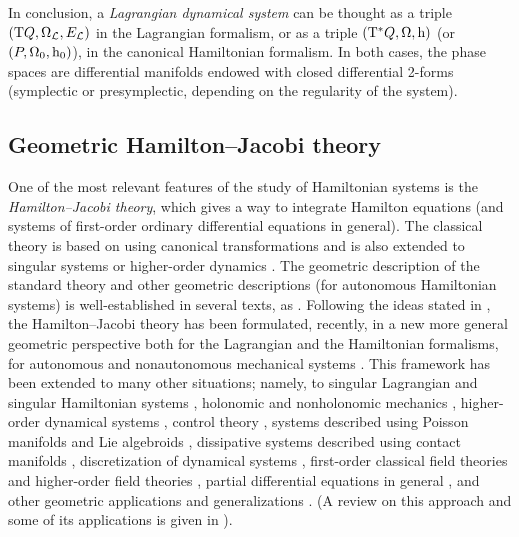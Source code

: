 \documentclass[12pt]{report}
\def\Lag{{\cal L}}
\def\Tan{{\rm T}}
\begin{document}
In conclusion, a {\sl Lagrangian dynamical system} 
can be thought as a triple $(\Tan Q,\Omega_{\Lag},E_{\Lag})$
in the Lagrangian formalism, or
as a triple $(\Tan^* Q,\Omega,{\rm h})$ (or $(P,\Omega_0,{\rm h}_0)$),
in the canonical Hamiltonian formalism.
In both cases,  the phase spaces are differential manifolds
endowed with closed differential 2-forms (symplectic or presymplectic,
depending on the regularity of the system).


 \subsection{Geometric Hamilton--Jacobi theory}
\label{firstsec}


One of the most relevant features of the study of Hamiltonian systems is the
{\sl Hamilton--Jacobi theory}, which gives a way to integrate 
 Hamilton equations (and systems of first-order ordinary differential equations in general).
The classical theory is based on using canonical transformations
\cite{Ar-89,JS-98,Ga-70,LL-76,SC-71} and is also extended to singular systems \cite{Gomis1} 
or higher-order dynamics \cite{art:Constantelos84}.
The geometric description of the standard theory and other  geometric descriptions (for autonomous Hamiltonian systems)
is well-established in several texts, as \cite{AM-78,Ar-89,JS-98,BT-80,LM-sgam,MMMcq}.
Following the ideas stated in  \cite{AM-78,KV-1993},
the Hamilton--Jacobi theory has been formulated, recently, in a new more general geometric perspective
both for the Lagrangian and the Hamiltonian formalisms, 
for autonomous and nonautonomous mechanical systems \cite{CGMMR-06}. 
This framework has been extended to many other situations; namely,
to singular Lagrangian and singular Hamiltonian systems \cite{LMV-12,LMV-13,LOS-12},
holonomic and nonholonomic mechanics
\cite{BFS-14,HJTeam2,leones2,leones1,LOS-12,blo,OFB-11},
higher-order dynamical systems \cite{CLRP-13,CLRP-14},
control theory \cite{BLMMM-12,Wang2},
systems described using Poisson manifolds \cite{LMV-13,GP-2016} 
and Lie algebroids \cite{BMMP-10,LS-12},
dissipative systems described using contact manifolds \cite{LLLR-2023,dLLM-2021,
GP-2020},
discretization of dynamical systems \cite{BDM-12,OBL-11},
first-order classical field theories \cite{CLMV-14,LMM-09,LMMSV-12,LPRV-2017,DeLeon_Vilarino}
and higher-order field theories \cite{Vi-10,art:Vitagliano12},
partial differential equations in general \cite{Vi-11,Vi-14},
and other geometric applications and generalizations \cite{BLM-12,HJTeam3,GMP-2021,Wang3}.
(A review on this approach and some of its applications is given in \cite{RR-2021}).
\end{document}

